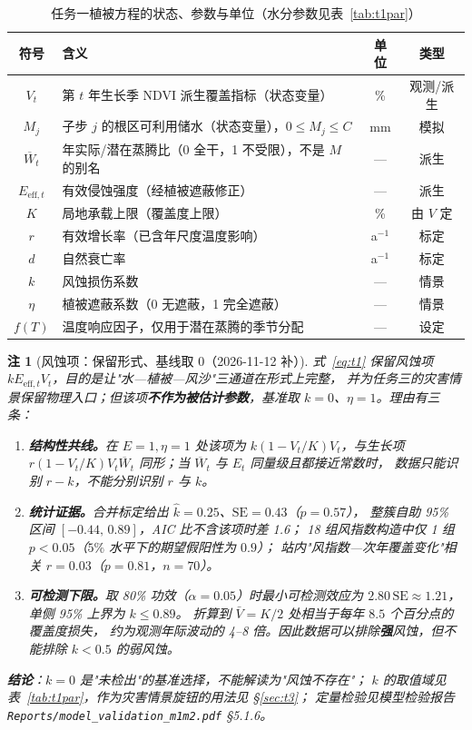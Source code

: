 \documentclass[11pt,a4paper]{ctexart}
\newtheorem{remark}{注}
\begin{document}
\begin{table}[H]\centering\small
\begin{tabularx}{\textwidth}{|c|X|c|c|}
\toprule
符号 & 含义 & 单位 & 类型 \\
\midrule
$V_t$ & 第 $t$ 年生长季 NDVI 派生覆盖指标（状态变量） & \% & 观测/派生 \\
$M_j$ & 子步 $j$ 的根区可利用储水（状态变量），$0\le M_j\le C$ & mm & 模拟 \\
$\overline W_t$ & 年实际/潜在蒸腾比（0 全干，1 不受限），不是 $M$ 的别名 & — & 派生 \\
$E_{\mathrm{eff},t}$ & 有效侵蚀强度（经植被遮蔽修正） & — & 派生 \\
$K$ & 局地承载上限（覆盖度上限） & \% & 由 $V$ 定 \\
$r$ & 有效增长率（已含年尺度温度影响） & a$^{-1}$ & 标定 \\
$d$ & 自然衰亡率 & a$^{-1}$ & 标定 \\
$k$ & 风蚀损伤系数 & — & 情景 \\
$\eta$ & 植被遮蔽系数（0 无遮蔽，1 完全遮蔽） & — & 情景 \\
$f(T)$ & 温度响应因子，仅用于潜在蒸腾的季节分配 & — & 设定 \\
\bottomrule
\end{tabularx}
\caption{任务一植被方程的状态、参数与单位（水分参数见表~\ref{tab:t1par}）}\label{tab:t1sym}
\end{table}

\begin{remark}[风蚀项：保留形式、基线取 0（2026-11-12 补）]\label{rem:wind}
式~\eqref{eq:t1} 保留风蚀项 $kE_{\mathrm{eff},t}V_t$，目的是让"水—植被—风沙"三通道在形式上完整，
并为任务三的灾害情景保留物理入口；但该项\textbf{不作为被估计参数}，基准取 $k=0$、$\eta=1$。理由有三条：
\begin{enumerate}
\item \textbf{结构性共线。}在 $E=1,\eta=1$ 处该项为 $k(1-V_t/K)V_t$，与生长项
      $r(1-V_t/K)V_t\overline W_t$ 同形；当 $\overline W_t$ 与 $E_t$ 同量级且都接近常数时，
      数据只能识别 $r-k$，不能分别识别 $r$ 与 $k$。
\item \textbf{统计证据。}合并标定给出 $\hat k=0.25$、$\mathrm{SE}=0.43$（$p=0.57$），
      整簇自助 95\% 区间 $[-0.44,\,0.89]$，AIC 比不含该项时差 1.6；
      18 组风指数构造中仅 1 组 $p<0.05$（$5\%$ 水平下的期望假阳性为 $0.9$）；
      站内"风指数—次年覆盖变化"相关 $r=0.03$（$p=0.81$，$n=70$）。
\item \textbf{可检测下限。}取 80\% 功效（$\alpha=0.05$）时最小可检测效应为
      $2.80\,\mathrm{SE}\approx1.21$，单侧 95\% 上界为 $k\le0.89$。
      折算到 $\bar V=K/2$ 处相当于每年 $8.5$ 个百分点的覆盖度损失，
      约为观测年际波动的 4--8 倍。因此数据可以排除\textbf{强}风蚀，但不能排除 $k<0.5$ 的弱风蚀。
\end{enumerate}
\textbf{结论}：$k=0$ 是"未检出"的基准选择，\emph{不能}解读为"风蚀不存在"；
$k$ 的取值域见表~\ref{tab:t1par}，作为灾害情景旋钮的用法见 \S\ref{sec:t3}；
定量检验见模型检验报告 \texttt{Reports/model\_validation\_m1m2.pdf} \S5.1.6。
\end{remark}
\end{document}
